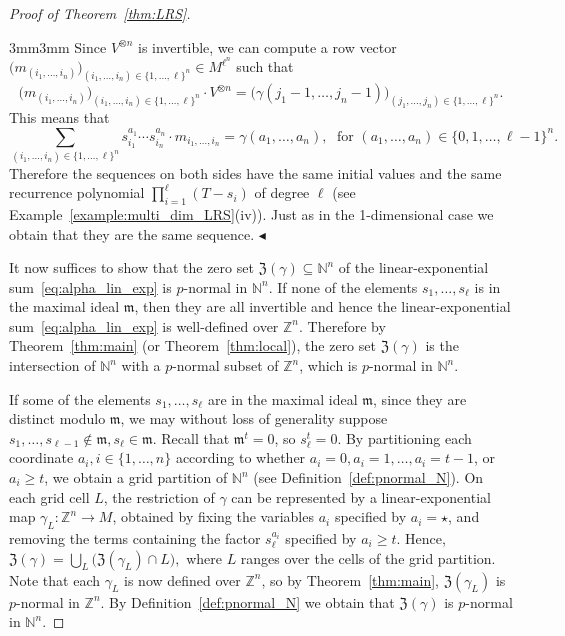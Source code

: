\documentclass[letterpaper, 11pt, thm-restate]{article}
\numberwithin{equation}{section}
\newcommand{\Z}{\mathbb{Z}}
\newcommand{\N}{\mathbb{N}}
\newcommand{\mZ}{\mathfrak{Z}}
\newcommand{\frm}{\mathfrak{m}}
\theoremstyle{definition}
\theoremstyle{definition}
\theoremstyle{definition}
\begin{document}
\begin{proof}[Proof of Theorem~\ref{thm:LRS}]
\begin{adjustwidth}{3mm}{3mm}
    Since $V^{\otimes n}$ is invertible, we can compute a row vector $\big(m_{(i_1, \ldots, i_n)}\big)_{(i_1, \ldots, i_n) \in \{1, \ldots, \ell\}^n} \in M^{\ell^n}$ such that
    \[
    \Big(m_{(i_1, \ldots, i_n)}\Big)_{(i_1, \ldots, i_n) \in \{1, \ldots, \ell\}^n} \cdot V^{\otimes n} =  \Big(\gamma(j_1-1, \ldots, j_n-1)\Big)_{(j_1, \ldots, j_n) \in \{1, \ldots, \ell\}^n}.
    \]
    This means that
    \[
    \sum_{(i_1, \ldots, i_n) \in \{1, \ldots, \ell\}^n} s_{i_1}^{a_1} \cdots s_{i_n}^{a_n} \cdot m_{i_1, \ldots, i_n} = \gamma(a_1, \ldots, a_n),\; \text{ for } (a_1, \ldots, a_n) \in \{0, 1, \ldots, \ell-1\}^n.
    \]
    Therefore the sequences on both sides have the same initial values and the same recurrence polynomial $\prod_{i=1}^{\ell} (T-s_i)$ of degree $\ell$ (see Example~\ref{example:multi_dim_LRS}(iv)).
    Just as in the 1-dimensional case we obtain that they are the same sequence.
    \hfill $\blacktriangleleft$
    \end{adjustwidth}
    \medskip

\noindent It now suffices to show that the zero set $\mZ(\gamma) \subseteq \N^n$ of the linear-exponential sum~\eqref{eq:alpha_lin_exp} is $p$-normal in $\N^n$.
If none of the elements $s_1, \ldots, s_{\ell}$ is in the maximal ideal $\frm$, then they are all invertible and hence the linear-exponential sum~\eqref{eq:alpha_lin_exp} is well-defined over $\Z^n$.
Therefore by Theorem~\ref{thm:main} (or Theorem~\ref{thm:local}), the zero set $\mZ(\gamma)$ is the intersection of $\N^n$ with a $p$-normal subset of $\Z^n$, which is $p$-normal in $\N^n$.

If some of the elements $s_1, \ldots, s_{\ell}$ are in the maximal ideal $\frm$, since they are distinct modulo $\frm$, we may without loss of generality suppose $s_1, \ldots, s_{\ell-1} \notin \frm, s_{\ell} \in \frm$.
Recall that $\frm^t = 0$, so $s_{\ell}^t=0$.
By partitioning each coordinate $a_i, i \in \{1, \ldots, n\}$ according to whether
$a_i = 0, a_i = 1, \ldots, a_i = t-1$, or $a_i \geq t$, we obtain a grid partition of $\N^n$ (see Definition~\ref{def:pnormal_N}).
On each grid cell $L$, the restriction of $\gamma$ can be represented by a linear-exponential map $\gamma_L \colon \Z^n \rightarrow M$, obtained by fixing the variables $a_i$ specified by $a_i = \star$, and removing the terms containing the factor $s_\ell^{a_i}$ specified by $a_i\ge t$. 
Hence,
$
\mZ(\gamma)=\bigcup_L \bigl(\mZ(\gamma_L)\cap L\bigr),
$
where $L$ ranges over the cells of the grid partition.
Note that each $\gamma_{L}$ is now defined over $\Z^n$, so by Theorem~\ref{thm:main}, $\mZ(\gamma_L)$ is $p$-normal in $\Z^n$.
By Definition~\ref{def:pnormal_N} we obtain that $\mZ(\gamma)$ is $p$-normal in $\N^n$.
\end{proof}
\end{document}
